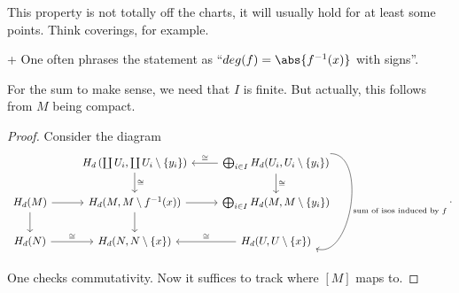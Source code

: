 \begin{oral}
  This property is not totally off the charts,
  it will usually hold for at least some points.
  Think coverings, for example.
\end{oral}

\begin{remark}+
  One often phrases the statement as
  \enquote{$deg(f) = \abs{f^{-1}(x)}$ with signs}.
\end{remark}

\begin{remark}
  For the sum to make sense, we need that $I$ is finite.
  But actually, this follows from $M$ being compact.
\end{remark}

\begin{proof}
  Consider the diagram
  \[
    \begin{tikzcd}
      &
      H_d\left(\coprod U_i, \coprod U_i \setminus \set{ y_i } \right)
      \ar{d}{\cong}
      &
      \directsum_{i \in I} H_d(U_i, U_i \setminus \set{ y_i } )
      \ar[swap]{l}{\cong}
      \ar{d}{\cong}
      \ar[bend left = 100]{dd}{\text{sum of isos induced by $f$}}
      \\
      H_d(M)
      \ar{r}
      \ar{d}
      &
      H_d(M, M\setminus f^{-1}(x))
      \ar{d}
      \ar{r}
      &
      \directsum_{i \in I} H_d(M, M\setminus \set{ y_i } )
      \\
      H_d(N)
      \ar{r}{\cong}
      &
      H_d(N,N\setminus \set{ x } )
      &
      H_d(U, U\setminus \set{ x } )
      \ar[swap]{l}{\cong}
    \end{tikzcd}
  .\]
  One checks commutativity.
  Now it suffices to track where $[M]$ maps to.
\end{proof}
